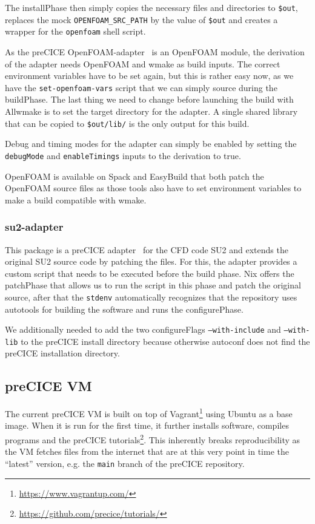 \documentclass{eceasst}
\begin{document}
The installPhase then simply copies the necessary files and directories to \texttt{\$out}, replaces the mock \texttt{OPENFOAM\_SRC\_PATH} by the value of \texttt{\$out} and creates a wrapper for the \texttt{openfoam} shell script.

As the preCICE OpenFOAM-adapter~\cite{OpenFOAMpreCICE} is an OpenFOAM module, the derivation of the adapter needs OpenFOAM and wmake as build inputs.
The correct environment variables have to be set again, but this is rather easy now, as we have the \texttt{set-openfoam-vars} script that we can simply source during the buildPhase.
The last thing we need to change before launching the build with Allwmake is to set the target directory for the adapter.
A single shared library that can be copied to \texttt{\$out/lib/} is the only output for this build.

Debug and timing modes for the adapter can simply be enabled by setting the \texttt{debugMode} and \texttt{enableTimings} inputs to the derivation to true.

OpenFOAM is available on Spack and EasyBuild that both patch the OpenFOAM source files as those tools also have to set environment variables to make a build compatible with wmake.\\

\subsubsection{su2-adapter}

This package is a preCICE adapter~\cite{Uekermann2017_Adapters} for the CFD code SU2 and extends the original SU2 source code by patching the files.
For this, the adapter provides a custom script that needs to be executed before the build phase.
Nix offers the patchPhase that allows us to run the script in this phase and patch the original source, after that the \texttt{stdenv} automatically recognizes that the repository uses autotools for building the software and runs the configurePhase.

We additionally needed to add the two configureFlags \texttt{--with-include} and \texttt{--with-lib} to the preCICE install directory because otherwise autoconf does not find the preCICE installation directory.

\subsection{preCICE VM}

The current preCICE VM is built on top of Vagrant\footnote{\url{https://www.vagrantup.com/}} using Ubuntu as a base image.
When it is run for the first time, it further installs software, compiles programs and the preCICE tutorials\footnote{\url{https://github.com/precice/tutorials/}}.
This inherently breaks reproducibility as the VM fetches files from the internet that are at this very point in time the ``latest'' version, e.g. the \texttt{main} branch of the preCICE repository.
\end{document}
